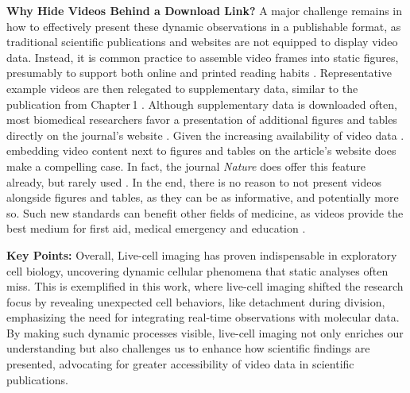 \textbf{Why Hide Videos Behind a Download Link?} A major challenge remains in
how to effectively present these dynamic observations in a publishable format,
as traditional scientific publications and websites are not equipped to display
video data. Instead, it is common practice to assemble video frames into static
figures, presumably to support both online and printed reading habits
\cite{perasDigitalPaperReading2023}. Representative example videos are then
relegated to supplementary data, similar to the publication from Chapter\,1
\cite{kuricModelingMyelomaDissemination2024}. Although supplementary data is
downloaded often, most biomedical researchers favor a presentation of additional
figures and tables directly on the journal's website
\cite{priceRoleSupplementaryMaterial2018}. Given the increasing availability of
video data%
. %
embedding video content next to figures and tables on the article's website does
make a compelling case. In fact, the journal \emph{Nature} does offer this
feature already, but rarely used \cite{NatureVideoContent}. In the end, there is
no reason to not present videos alongside figures and tables, as they can be as
informative, and potentially more so. Such new standards can benefit other
fields of medicine, as videos provide the best medium for first aid, medical
emergency and education \cite{guptaDatasetMedicalInstructional2023}.

\textbf{Key Points:} Overall, Live-cell imaging has proven indispensable in
exploratory cell biology, uncovering dynamic cellular phenomena that static
analyses often miss. This is exemplified in this work, where live-cell imaging
shifted the research focus by revealing unexpected cell behaviors, like
detachment during division, emphasizing the need for integrating real-time
observations with molecular data. By making such dynamic processes visible,
live-cell imaging not only enriches our understanding but also challenges us to
enhance how scientific findings are presented, advocating for greater
accessibility of video data in scientific publications.

\newpage



